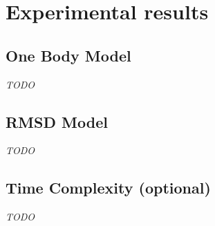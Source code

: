 \documentclass[/home/francois/latex/report/main.tex]{subfiles}
\begin{document}
\chapter{Experimental results}
\label{chapter:results}

\section{One Body Model}

\textit{TODO}

\section{RMSD Model}

\textit{TODO}

\section{Time Complexity (optional)}

\textit{TODO}
\end{document}

